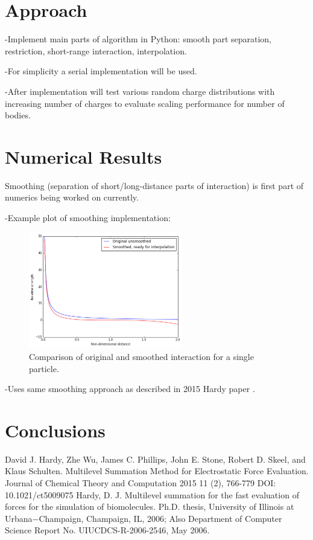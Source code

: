 \documentclass[review]{siamart}
\begin{document}
\section{Approach}\label{sec:main}
-Implement main parts of algorithm in Python: smooth part separation, restriction, short-range interaction, interpolation.

-For simplicity a serial implementation will be used.

-After implementation will test various random charge distributions with increasing number of charges to evaluate scaling performance for number of bodies.

\section{Numerical Results}\label{sec:num}
Smoothing (separation of short/long-distance parts of interaction) is first part of numerics being worked on currently.

-Example plot of smoothing implementation:
\begin{figure}[!htb]
\centering
\includegraphics[width=0.6\textwidth]{smooth.PNG}
\caption{\label{fig:unrolled}Comparison of original and smoothed interaction for a single particle.}
\end{figure}

-Uses same smoothing approach as described in 2015 Hardy paper \cite{1}.

\section{Conclusions}\label{sec:conc}

\begin{thebibliography}{3}
 David J. Hardy, Zhe Wu, James C. Phillips, John E. Stone, Robert D. Skeel, and Klaus Schulten. Multilevel Summation Method for Electrostatic Force Evaluation. Journal of Chemical Theory and Computation 2015 11 (2), 766-779 DOI: 10.1021/ct5009075
Hardy, D. J. Multilevel summation for the fast evaluation of forces for the simulation of biomolecules. Ph.D. thesis, University of Illinois at Urbana−Champaign, Champaign, IL, 2006; Also Department of Computer Science Report No. UIUCDCS-R-2006-2546, May 2006.
\end{thebibliography}
\end{document}
